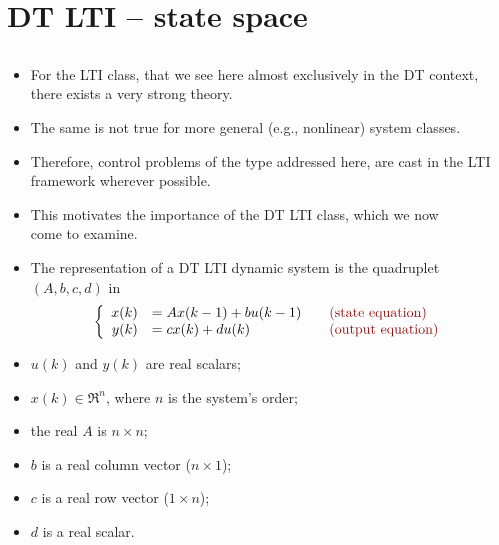 \section{DT LTI -- state space}

\subsection{}

\begin{frame}
\begin{itemize}[<+-| alert@+>]
\item For the LTI class, that we see here almost exclusively in the DT context, there exists a very strong theory.
\item The same is not true for more general (e.g., nonlinear) system classes.
\item Therefore, control problems of the type addressed here, are cast in the LTI framework wherever possible.
\item \vfill This motivates the importance of the DT LTI class, which we now\\
      come to examine.
\end{itemize}
\end{frame}

\begin{frame}
\myPause
\begin{itemize}[<+-| alert@+>]
\item The  representation of a DT LTI dynamic system is the quadruplet $(A,b,c,d)$ in
      \begin{displaymath}
       \left\{
        \begin{array}{rlll}
         x(k) &= A x(k-1) + b u(k-1) & & \text{\TC{(state equation)}}  \\
         y(k) &= c x(k)   + d u(k)   & & \text{\TC{(output equation)}}
        \end{array}
       \right.
      \end{displaymath}    
\item $u(k)$ and $y(k)$ are real scalars;
\item $x(k) \in \Re^n$, where $n$ is the system's order;
\item the real  $A$ is $n \times n$;
\item $b$ is a real column vector ($n \times 1$);
\item $c$ is a real row vector ($1 \times n$);
\item $d$ is a real scalar.
\end{itemize}
\end{frame}


